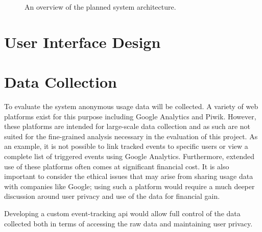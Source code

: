 \documentclass[bsc,twoside,singlespacing,parskip,logo,notimes,normalheadings]{infthesis}
\begin{document}
\begin{figure}[!ht]
{
      }
      \captionsetup{justification=centering}
      \caption{An overview of the planned system architecture.}\label{fig:sysarch}
    \end{figure}


    \section{User Interface Design}\label{sec:design-interface}

    

    \section{Data Collection}

    To evaluate the system anonymous usage data will be collected. A
    variety of web platforms exist for this purpose including Google
    Analytics and Piwik. However, these platforms are intended for
    large-scale data collection and as such are not suited for the
    fine-grained analysis necessary in the evaluation of this
    project. As an example, it is not possible to link tracked events
    to specific users or view a complete list of triggered events
    using Google Analytics. Furthermore, extended use of these
    platforms often comes at significant financial cost. It is also
    important to consider the ethical issues that may arise from
    sharing usage data with companies like Google; using such a
    platform would require a much deeper discussion around user
    privacy and use of the data for financial gain.

    Developing a custom event-tracking \gls{api} would allow full
    control of the data collected both in terms of accessing the raw
    data and maintaining user privacy.
\end{document}
